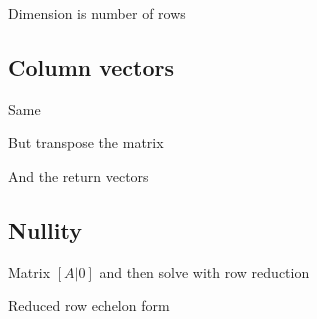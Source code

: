 \documentclass{extarticle}
\begin{document}
Dimension is number of rows




\subsection{Column vectors}

Same

But transpose the matrix

And the return vectors



\subsection{Nullity}

Matrix $[A|0]$
and then solve with row reduction

Reduced row echelon form
\end{document}
